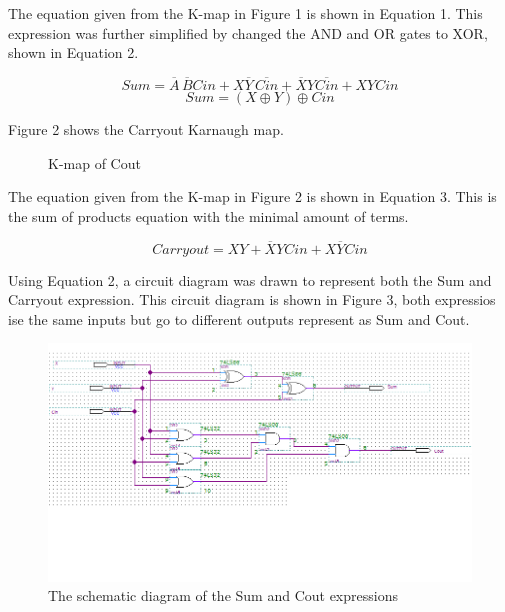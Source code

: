 \documentclass[CMPE]{KGCOEReport}
\begin{document}
The equation given from the K-map in Figure 1 is shown in Equation 1. This expression was further simplified by changed the AND and OR gates to XOR, shown in Equation 2.

\begin{equation} Sum = \overline{A}\,\overline{B} Cin + X\overline{Y}\,\overline{Cin} + \overline{X}Y\overline{Cin} + XYCin \end{equation}
\begin{equation} Sum = (X \oplus Y) \oplus Cin \end{equation}

Figure 2 shows the Carryout Karnaugh map.

\begin{figure}[H]
	\centering
	\begin{Karnaugh3Var}[A][B][Cin]
		\end{Karnaugh3Var}
		\caption{K-map of Cout}
		\label{fig: Figure 2}
\end{figure}

The equation given from the K-map in Figure 2 is shown in Equation 3. This is the sum of products equation with the minimal amount of terms.

\begin{equation} Carryout = XY + \overline{X}YCin + X\overline{Y}Cin \end{equation}

Using Equation 2, a circuit diagram was drawn to represent both the Sum and Carryout expression. This circuit diagram is shown in Figure 3, both expressios ise the same inputs but go to different outputs represent as Sum and Cout.

\begin{figure}[H]
	\centering
	\includegraphics[width=1.0\textwidth]{QuartusL6}
	\caption{The schematic diagram of the Sum and Cout expressions}	
	\label{fig: Figure 3}
\end{figure}
\end{document}
